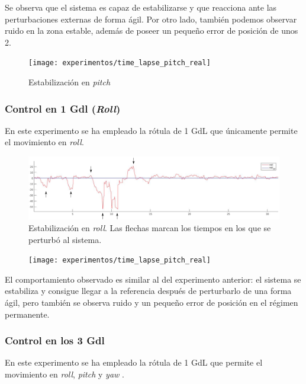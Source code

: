 Se observa que el sistema es capaz de estabilizarse y que reacciona ante las perturbaciones externas de forma ágil. Por otro lado, también podemos observar ruido en la zona estable, además de poseer un pequeño error de posición de unos 2\grad.

\begin{figure}[htb!]
	\centering
	\texttt{[image: experimentos/time\_lapse\_pitch\_real]}
	\caption{Estabilización en \textit{pitch}}
	\label{tl_pr}	
\end{figure}


\subsubsection{Control en 1 Gdl (\textit{Roll})}
En este experimento se ha empleado la rótula de 1 GdL que únicamente permite el movimiento en \textit{roll}.

\begin{figure}[htb!]
	\centering
	\includegraphics[height=0.18\textheight,width=\textwidth]{experimentos/real_only_roll}
	\caption{Estabilización en \textit{roll}. Las flechas marcan los tiempos en los que se perturbó al sistema.}
	\label{mat_lab_graph}	
\end{figure}

\begin{figure}[htb!]
	\centering
	\texttt{[image: experimentos/time\_lapse\_pitch\_real]}
	\caption{}
	\label{tl_pr}	
\end{figure}

El comportamiento observado es similar al del experimento anterior: el sistema se estabiliza y consigue llegar a la referencia después de perturbarlo de una forma ágil, pero también se observa ruido y un pequeño error de posición en el régimen permanente.

\subsubsection{Control en los 3 Gdl}

En este experimento se ha empleado la rótula de 1 GdL que permite el movimiento en \textit{roll}, \textit{pitch} y \textit{yaw} .
\\

